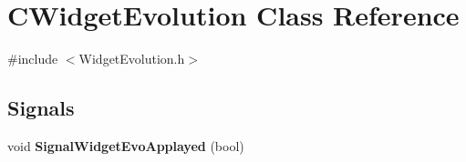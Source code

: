 \hypertarget{classCWidgetEvolution}{
\section{CWidgetEvolution Class Reference}
\label{classCWidgetEvolution}
}


{\ttfamily \#include $<$WidgetEvolution.h$>$}\subsection*{Signals}
\begin{DoxyCompactItemize}
\item 
\hypertarget{classCWidgetEvolution_aaacd71b8fa235871df73b20f2ff5cfba}{
void {\bfseries SignalWidgetEvoApplayed} (bool)}
\label{classCWidgetEvolution_aaacd71b8fa235871df73b20f2ff5cfba}

\end{DoxyCompactItemize}
